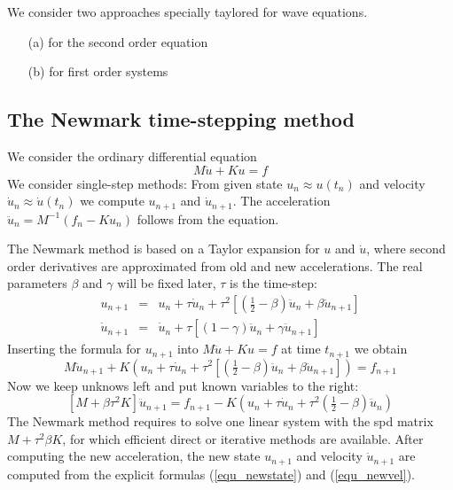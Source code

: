 We consider two approaches specially taylored for wave equations.
\begin{itemize}
\item[(a)] for the second order equation
\item[(b)] for first order systems
\end{itemize}

\subsection{The Newmark time-stepping method}
We consider the ordinary differential equation
$$
M \ddot u + K u = f
$$
We consider single-step methods: From given state $u_n \approx u(t_n)$ and velocity $\dot u_n \approx \dot u(t_n)$ we compute $u_{n+1}$ and $\dot u_{n+1}$. The acceleration $\ddot u_n = M^{-1} (f_n - K u_n)$ follows from the equation.

The Newmark method is based on a Taylor expansion for $u$ and $\dot u$, where second order derivatives are approximated from old and new accelerations. The real parameters $\beta$ and $\gamma$ will be fixed later, $\tau$ is the time-step:
\begin{eqnarray}
\label{equ_newstate}
u_{n+1} & = & u_n + \tau \dot u_n + \tau^2 \left[  (\tfrac{1}{2} - \beta) \ddot u_n + \beta \ddot u_{n+1}  \right] \\
\label{equ_newvel}
\dot u_{n+1} & = & \dot u_n + \tau \left[   (1-\gamma) \ddot u_n + \gamma \ddot u_{n+1} \right]
\end{eqnarray}
Inserting the formula for $u_{n+1}$ into $M \ddot u + K u = f$ at time
$t_{n+1}$ we obtain
$$
M \ddot u_{n+1} + K \left( u_n + \tau \dot u_n + \tau^2 \left[  (\tfrac{1}{2} - \beta) \ddot u_n + \beta \ddot u_{n+1}  \right] \right) = f_{n+1}
$$
Now we keep unknows left and put known variables to the right:
$$
\left[ M + \beta \tau^2 K \right] \ddot u_{n+1} = f_{n+1} - K \left( u_n + \tau \dot u_n + \tau^2 (\tfrac{1}{2} - \beta) \ddot u_n \right)
$$
The Newmark method requires to solve one linear system with the spd matrix $M + \tau^2 \beta K$, for which efficient direct or iterative methods are available. After computing the new acceleration, the new state $u_{n+1}$ and velocity $\dot u_{n+1}$ are computed from the explicit formulas (\ref{equ_newstate}) and (\ref{equ_newvel}).

\medskip

